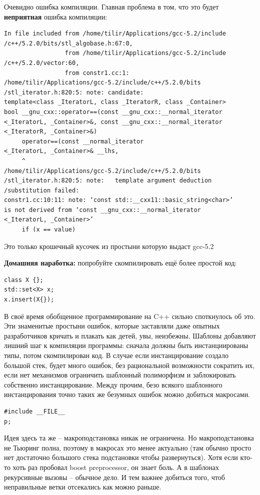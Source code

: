 \documentclass[a4paper,12pt,oneside]{book}
\newif\ifanswers
\begin{document}
Очевидно ошибка компиляции. Главная проблема в том, что это будет \textbf{неприятная} ошибка компиляции:

\begin{verbatim}
In file included from /home/tilir/Applications/gcc-5.2/include
/c++/5.2.0/bits/stl_algobase.h:67:0,
                 from /home/tilir/Applications/gcc-5.2/include
/c++/5.2.0/vector:60,
                 from constr1.cc:1:
/home/tilir/Applications/gcc-5.2/include/c++/5.2.0/bits
/stl_iterator.h:820:5: note: candidate: 
template<class _IteratorL, class _IteratorR, class _Container> 
bool __gnu_cxx::operator==(const __gnu_cxx::__normal_iterator
<_IteratorL, _Container>&, const __gnu_cxx::__normal_iterator
<_IteratorR, _Container>&)
     operator==(const __normal_iterator
<_IteratorL, _Container>& __lhs,
     ^
/home/tilir/Applications/gcc-5.2/include/c++/5.2.0/bits
/stl_iterator.h:820:5: note:   template argument deduction
/substitution failed:
constr1.cc:10:11: note: ‘const std::__cxx11::basic_string<char>’ 
is not derived from ‘const __gnu_cxx::__normal_iterator
<_IteratorL, _Container>’
     if (x == value)
\end{verbatim}

Это только крошечный кусочек из простыни которую выдаст gcc-5.2

\textbf{Домашняя наработка:} попробуйте скомпилировать ещё более простой код:

\begin{lstlisting}
class X {};
std::set<X> x;
x.insert(X{});
\end{lstlisting}

В своё время обобщенное программирование на C++ сильно споткнулось об это. Эти знаменитые простыни ошибок, которые заставляли даже опытных разработчиков кричать и плакать как детей, увы, неизбежны. Шаблоны добавляют лишний шаг к компиляции программы: сначала должны быть инстанциированы типы, потом скомпилирован код. В случае если инстанцирование создало большой стек, будет много ошибок, без рациональной возможности сократить их, если нет механизмов ограничить шаблонный полиморфизм и заблокировать собственно инстанцирование. Между прочим, безо всякого шаблонного инстанцирования точно таких же безумных ошибок можно добиться макросами.

\begin{lstlisting}
#include __FILE__
p;
\end{lstlisting}

Идея здесь та же -- макроподстановка никак не ограничена. Но макроподстановка не Тьюринг полна, поэтому в макросах это менее актуально (там обычно просто нет достаточно большого стека подстановки чтобы развернуться). Хотя если кто-то хоть раз пробовал boost preprocessor, он знает боль. А в шаблонах рекурсивные вызовы -- обычное дело. И тем важнее добиться того, чтоб неправильные ветки отсекались как можно раньше.
\end{document}
